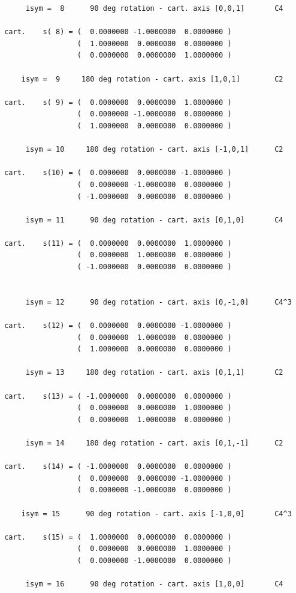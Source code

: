 \documentclass[12pt,a4paper]{article}
\begin{document}
\begin{verbatim}
      isym =  8      90 deg rotation - cart. axis [0,0,1]       C4

 cart.    s( 8) = (  0.0000000 -1.0000000  0.0000000 )
                  (  1.0000000  0.0000000  0.0000000 )
                  (  0.0000000  0.0000000  1.0000000 )

     isym =  9     180 deg rotation - cart. axis [1,0,1]        C2

 cart.    s( 9) = (  0.0000000  0.0000000  1.0000000 )
                  (  0.0000000 -1.0000000  0.0000000 )
                  (  1.0000000  0.0000000  0.0000000 )

      isym = 10     180 deg rotation - cart. axis [-1,0,1]      C2

 cart.    s(10) = (  0.0000000  0.0000000 -1.0000000 )
                  (  0.0000000 -1.0000000  0.0000000 )
                  ( -1.0000000  0.0000000  0.0000000 )

      isym = 11      90 deg rotation - cart. axis [0,1,0]       C4

 cart.    s(11) = (  0.0000000  0.0000000  1.0000000 )
                  (  0.0000000  1.0000000  0.0000000 )
                  ( -1.0000000  0.0000000  0.0000000 )


      isym = 12      90 deg rotation - cart. axis [0,-1,0]      C4^3

 cart.    s(12) = (  0.0000000  0.0000000 -1.0000000 )
                  (  0.0000000  1.0000000  0.0000000 )
                  (  1.0000000  0.0000000  0.0000000 )

      isym = 13     180 deg rotation - cart. axis [0,1,1]       C2

 cart.    s(13) = ( -1.0000000  0.0000000  0.0000000 )
                  (  0.0000000  0.0000000  1.0000000 )
                  (  0.0000000  1.0000000  0.0000000 )

      isym = 14     180 deg rotation - cart. axis [0,1,-1]      C2

 cart.    s(14) = ( -1.0000000  0.0000000  0.0000000 )
                  (  0.0000000  0.0000000 -1.0000000 )
                  (  0.0000000 -1.0000000  0.0000000 )

     isym = 15      90 deg rotation - cart. axis [-1,0,0]       C4^3

 cart.    s(15) = (  1.0000000  0.0000000  0.0000000 )
                  (  0.0000000  0.0000000  1.0000000 )
                  (  0.0000000 -1.0000000  0.0000000 )

      isym = 16      90 deg rotation - cart. axis [1,0,0]       C4


\end{verbatim}
\end{document}

